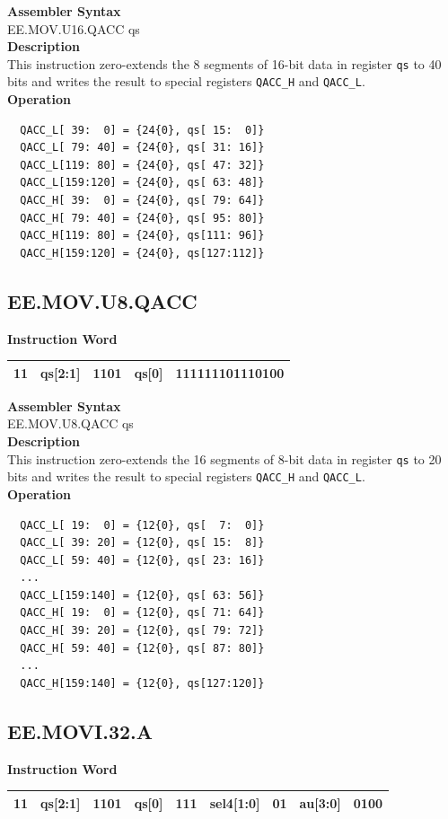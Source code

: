 \textbf{Assembler Syntax} \\
EE.MOV.U16.QACC qs \\
\textbf{Description} \\
This instruction zero-extends the 8 segments of 16-bit data in register \lstinline{qs} to 40 bits and writes the result to special registers \lstinline{QACC_H} and \lstinline{QACC_L}.\\
\textbf{Operation}
\begin{lstlisting}
  QACC_L[ 39:  0] = {24{0}, qs[ 15:  0]}
  QACC_L[ 79: 40] = {24{0}, qs[ 31: 16]}
  QACC_L[119: 80] = {24{0}, qs[ 47: 32]}
  QACC_L[159:120] = {24{0}, qs[ 63: 48]}
  QACC_H[ 39:  0] = {24{0}, qs[ 79: 64]}
  QACC_H[ 79: 40] = {24{0}, qs[ 95: 80]}
  QACC_H[119: 80] = {24{0}, qs[111: 96]}
  QACC_H[159:120] = {24{0}, qs[127:112]}
\end{lstlisting}

\clearpage
\subsection{EE.MOV.U8.QACC}\label{instruction:EEMOVU8QACC}
\setlength\tabcolsep{6pt}
\textbf{Instruction Word} \\
\begin{tabular}{|c|c|c|c|c|}
	\hline
	11 & qs[2:1] & 1101 & qs[0] & 111111101110100 \\
	\hline
\end{tabular}

\textbf{Assembler Syntax} \\
EE.MOV.U8.QACC qs \\
\textbf{Description} \\
This instruction zero-extends the 16 segments of 8-bit data in register \lstinline{qs} to 20 bits and writes the result to special registers \lstinline{QACC_H} and \lstinline{QACC_L}.\\
\textbf{Operation}
\begin{lstlisting}
  QACC_L[ 19:  0] = {12{0}, qs[  7:  0]}
  QACC_L[ 39: 20] = {12{0}, qs[ 15:  8]}
  QACC_L[ 59: 40] = {12{0}, qs[ 23: 16]}
  ...
  QACC_L[159:140] = {12{0}, qs[ 63: 56]}
  QACC_H[ 19:  0] = {12{0}, qs[ 71: 64]}
  QACC_H[ 39: 20] = {12{0}, qs[ 79: 72]}
  QACC_H[ 59: 40] = {12{0}, qs[ 87: 80]}
  ...
  QACC_H[159:140] = {12{0}, qs[127:120]}
\end{lstlisting}

\clearpage
\subsection{EE.MOVI.32.A}\label{instruction:EEMOVI32A}
\setlength\tabcolsep{6pt}
\textbf{Instruction Word} \\
\begin{tabular}{|c|c|c|c|c|c|c|c|c|}
	\hline
	11 & qs[2:1] & 1101 & qs[0] & 111 & sel4[1:0] & 01 & au[3:0] & 0100 \\
	\hline
\end{tabular}

